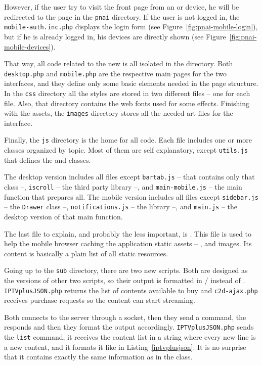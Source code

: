 However, if the user try to visit the front page from an  or  device, he will be redirected to the  page in the \texttt{pnai} directory.
If the user is not logged in, the \texttt{mobile-auth.inc.php} displays the login form (see Figure~\ref{fig:pnai-mobile-login}), but if he is already logged in, his devices are directly shown (see Figure~\ref{fig:pnai-mobile-devices}).

That way, all code related to the new  is all isolated in the  directory.
Both \texttt{desktop.php} and \texttt{mobile.php} are the respective main pages for the two interfaces, and they define only some basic elements needed in the page structure.
In the \texttt{css} directory all the styles are stored in two different files -- one for each file.
Also, that directory contains the web fonts used for some effects.
Finishing with the assets, the \texttt{images} directory stores all the needed art files for the interface.

Finally, the \texttt{js} directory is the home for all  code.
Each file includes one or more  classes organized by topic.
Most of them are self explanatory, except \texttt{utils.js} that defines the  and  classes.

The desktop version includes all files except \texttt{bartab.js} -- that contains only that class --, \texttt{iscroll} -- the third party library --, and \texttt{main-mobile.js} -- the main function that prepares all.
The mobile version includes all files except \texttt{sidebar.js} -- the \texttt{Drawer} class --, \texttt{notifications.js} -- the  library --, and \texttt{main.js} -- the desktop version of that main function.

The last file to explain, and probably the less important, is .
This file is used to help the mobile browser caching the application static assets -- ,  and images.
Its content is basically a plain list of all static resources.

Going up to the \texttt{sub} directory, there are two new  scripts.
Both are designed as the  versions of other two scripts, so their output is formatted in / instead of .
\texttt{IPTVplusJSON.php} returns the list of contents available to buy and \texttt{c2d-ajax.php} receives purchase requests so the content can start streaming.

Both connects to the  server through a socket, then they send a command, the  responds and then they format the output accordingly.
\texttt{IPTVplusJSON.php} sends the \texttt{list} command, it receives the content list in a string where every new line is a new content, and it formats it like in Listing~\ref{iptvplusjson}.
It is no surprise that it contains exactly the same information as in the   class.

